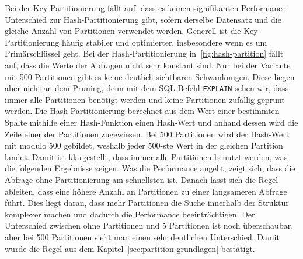 Bei der Key-Partitionierung fällt auf, dass es keinen signifikanten Performance-Unterschied zur Hash-Partitionierung gibt, sofern derselbe Datensatz und die gleiche Anzahl von Partitionen verwendet werden.
Generell ist die Key-Partitionierung häufig stabiler und optimierter, insbesondere wenn es um Primärschlüssel geht.
Bei der Hash-Partitionierung in~\ref{fig:hash-partition} fällt auf, dass die Werte der Abfragen nicht sehr konstant sind.
Nur bei der Variante mit 500 Partitionen gibt es keine deutlich sichtbaren Schwankungen.
Diese liegen aber nicht an dem Pruning, denn mit dem SQL-Befehl \texttt{EXPLAIN} sehen wir, dass immer alle Partitionen benötigt werden und keine Partitionen zufällig geprunt werden.
Die Hash-Partitionierung berechnet aus dem Wert einer bestimmten Spalte mithilfe einer Hash-Funktion einen Hash-Wert und anhand dessen wird die Zeile einer der Partitionen zugewiesen.
Bei 500 Partitionen wird der Hash-Wert mit modulo 500 gebildet, weshalb jeder 500-ste Wert in der gleichen Partition landet.
Damit ist klargestellt, dass immer alle Partitionen benutzt werden, was die folgenden Ergebnisse zeigen.
Was die Performance angeht, zeigt sich, dass die Abfrage ohne Partitionierung am schnellsten ist.
Danach lässt sich die Regel ableiten, dass eine höhere Anzahl an Partitionen zu einer langsameren Abfrage führt.
Dies liegt daran, dass mehr Partitionen die Suche innerhalb der Struktur komplexer machen und dadurch die Performance beeinträchtigen.
Der Unterschied zwischen ohne Partitionen und 5 Partitionen ist noch überschaubar, aber bei 500 Partitionen sieht man einen sehr deutlichen Unterschied.
Damit wurde die Regel aus dem Kapitel~\ref{sec:partition-grundlagen} bestätigt.


